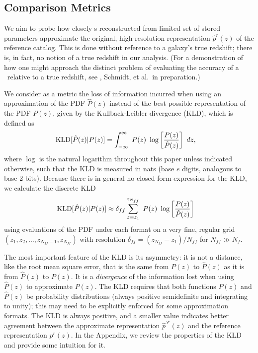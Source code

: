 \subsection{Comparison Metrics}

We aim to probe how closely \pz s reconstructed from limited set of stored 
parameters approximate the original, high-resolution representation 
$\hat{p}^{r}(z)$ of the reference catalog.
This is done without reference to a galaxy's true redshift; there is, in fact, 
no notion of a true redshift in our analysis.
(For a demonstration of how one might approach the distinct problem of 
evaluating the accuracy of a \pz\ relative to a true redshift, see 
\citet{polsterer_uncertain_2016}, Schmidt, et al.\ in preparation.)


We consider as a metric the loss of information incurred when using an 
approximation of the PDF $\hat{P}(z)$ instead of the best possible 
representation of the  PDF $P(z)$, given by the Kullback-Leibler divergence 
(KLD), which is defined as
\begin{align}
\eqlabel{eq:kld}
\mathrm{KLD}[\hat{P}(z) | P(z)] &= \int_{-\infty}^{\infty}\ P(z)\ 
\log\left[\frac{P(z)}{\hat{P}(z)}\right]\ dz,
\end{align}
where $\log$ is the natural logarithm throughout this paper unless indicated 
otherwise, such that the KLD is measured in nats (base $e$ digits, analogous to 
base 2 bits).
Because there is in general no closed-form expression for the KLD, we calculate 
the discrete KLD
\begin{align}
\eqlabel{eq:kld_approx}
\mathrm{KLD}[\hat{P}(z) | P(z)] &\approx 
\delta_{ff}\sum_{z=z_{1}}^{z_{N_{ff}}}\ P(z)\ 
\log\left[\frac{P(z)}{\hat{P}(z)}\right]
\end{align}
using evaluations of the PDF under each format on a very fine, regular grid 
$(z_{1}, z_{2}, \dots, z_{N_{ff}-1}, z_{N_{ff}})$ with resolution $\delta_{ff} 
= (z_{N_{ff}} -z_{1}) / N_{ff}$ for $N_{ff} \gg N_{f}$.

The most important feature of the KLD is its asymmetry: it is not a distance, 
like the root mean square error, that is the same from $P(z)$ to $\hat{P}(z)$ 
as it is from $\hat{P}(z)$ to $P(z)$.
It is a \textit{divergence} of the information lost when using $\hat{P}(z)$ to 
approximate $P(z)$.
The KLD requires that both functions $P(z)$ and $\hat{P}(z)$ be probability 
distributions (always positive semidefinite and integrating to unity); this may 
need to be explicitly enforced for some approximation formats.
The KLD is always positive, and a smaller value indicates better agreement 
between the approximate representation $\hat{p}^{\mathcal{F}}(z)$ and the 
reference representation $p^{r}(z)$.
In the Appendix, we review the properties of the KLD and provide some intuition 
for it.

